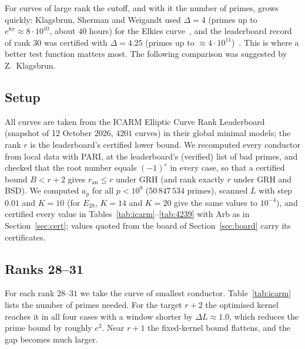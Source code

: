 \documentclass[11pt]{amsart}
\theoremstyle{remark}
\theoremstyle{definition}
\newcommand{\ran}{r_{\mathrm{an}}}
\begin{document}
For curves of large rank the cutoff, and with it the number of primes, grows quickly: Klagsbrun, Sherman and Weigandt used $\Delta=4$ (primes up to $e^{8\pi}\approx 8\cdot10^{10}$, about $40$ hours) for the Elkies curve~\cite{KSW}, and the leaderboard record of rank $30$ was certified with $\Delta=4.25$ (primes up to $\approx4\cdot10^{11}$)~\cite{ICARM}. This is where a better test function matters most. The following comparison was suggested by Z.~Klagsbrun.

\subsection*{Setup}
All curves are taken from the ICARM Elliptic Curve Rank Leaderboard~\cite{ICARM} (snapshot of 12 October 2026, $4201$ curves) in their global minimal models; the rank $r$ is the leaderboard's certified lower bound. We recomputed every conductor from local data with PARI, at the leaderboard's (verified) list of bad primes, and checked that the root number equals $(-1)^r$ in every case, so that a certified bound $B<r+2$ gives $\ran\le r$ under GRH (and rank exactly $r$ under GRH and BSD). We computed $a_p$ for all $p<10^9$ ($50\,847\,534$ primes), scanned $L$ with step $0.01$ and $K=10$ (for $E_{28}$, $K=14$ and $K=20$ give the same values to $10^{-4}$), and certified every value in Tables~\ref{tab:icarm}--\ref{tab:4239} with Arb as in Section~\ref{sec:cert}; values quoted from the board of Section~\ref{sec:board} carry its certificates.

\subsection*{Ranks 28--31}
For each rank $28$--$31$ we take the curve of smallest conductor. Table~\ref{tab:icarm} lists the number of primes needed. For the target $r+2$ the optimised kernel reaches it in all four cases with a window shorter by
$\Delta L\approx1.0$, which reduces the prime bound by roughly $e^{2}$. Near $r+1$ the fixed-kernel bound flattens, and the gap becomes much larger.
\end{document}
